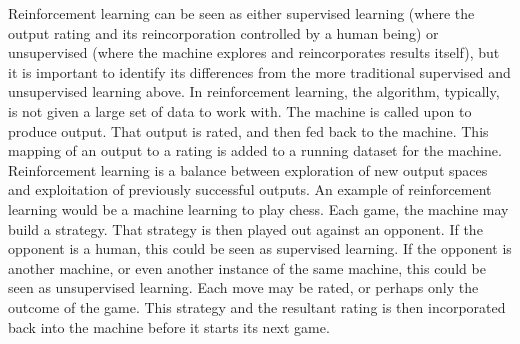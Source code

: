 Reinforcement learning can be seen as either supervised learning (where the output rating and its reincorporation controlled by a human being) or unsupervised (where the machine explores and reincorporates results itself), but it is important to identify its differences from the more traditional supervised and unsupervised learning above. In reinforcement learning, the algorithm, typically, is not given a large set of data to work with. The machine is called upon to produce output. That output is rated, and then fed back to the machine. This mapping of an output to a rating is added to a running dataset for the machine. Reinforcement learning is a balance between exploration of new output spaces and exploitation of previously successful outputs. An example of reinforcement learning would be a machine learning to play chess. Each game, the machine may build a strategy. That strategy is then played out against an opponent. If the opponent is a human, this could be seen as supervised learning. If the opponent is another machine, or even another instance of the same machine, this could be seen as unsupervised learning. Each move may be rated, or perhaps only the outcome of the game. This strategy and the resultant rating is then incorporated back into the machine before it starts its next game. 

